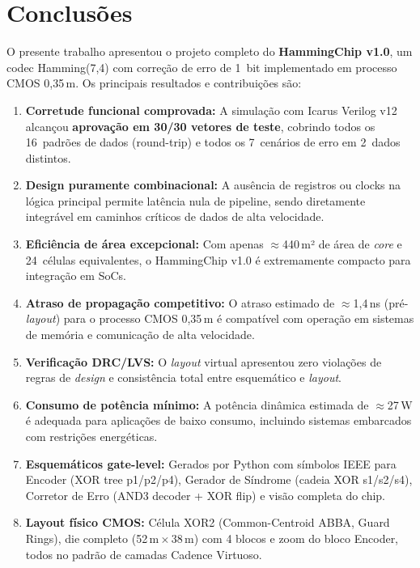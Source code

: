 \documentclass[12pt,a4paper]{article}
\begin{document}
\section{Conclusões}

O presente trabalho apresentou o projeto completo do \textbf{HammingChip v1.0}, um codec Hamming(7,4) com correção de erro de 1~bit implementado em processo CMOS 0,35\,\textmu m. Os principais resultados e contribuições são:

\begin{enumerate}[leftmargin=2em,label=\textbf{\arabic*.}]
  \item \textbf{Corretude funcional comprovada:} A simulação com Icarus Verilog v12 alcançou \textbf{aprovação em 30/30 vetores de teste}, cobrindo todos os 16~padrões de dados (round-trip) e todos os 7~cenários de erro em 2~dados distintos.

  \item \textbf{Design puramente combinacional:} A ausência de registros ou clocks na lógica principal permite latência nula de pipeline, sendo diretamente integrável em caminhos críticos de dados de alta velocidade.

  \item \textbf{Eficiência de área excepcional:} Com apenas $\approx$440\,\textmu m² de área de \textit{core} e 24~células equivalentes, o HammingChip v1.0 é extremamente compacto para integração em SoCs.

  \item \textbf{Atraso de propagação competitivo:} O atraso estimado de $\approx$1,4\,ns (pré-\textit{layout}) para o processo CMOS 0,35\,\textmu m é compatível com operação em sistemas de memória e comunicação de alta velocidade.

  \item \textbf{Verificação DRC/LVS:} O \textit{layout} virtual apresentou zero violações de regras de \textit{design} e consistência total entre esquemático e \textit{layout}.

  \item \textbf{Consumo de potência mínimo:} A potência dinâmica estimada de $\approx$27\,\textmu W é adequada para aplicações de baixo consumo, incluindo sistemas embarcados com restrições energéticas.

  \item \textbf{Esquemáticos gate-level:} Gerados por Python com símbolos IEEE para Encoder (XOR tree p1/p2/p4), Gerador de Síndrome (cadeia XOR s1/s2/s4), Corretor de Erro (AND3 decoder + XOR flip) e visão completa do chip.

  \item \textbf{Layout físico CMOS:} Célula XOR2 (Common-Centroid ABBA, Guard Rings), die completo (52\,\textmu m\,$\times$\,38\,\textmu m) com 4 blocos e zoom do bloco Encoder, todos no padrão de camadas Cadence Virtuoso.
\end{enumerate}
\end{document}

